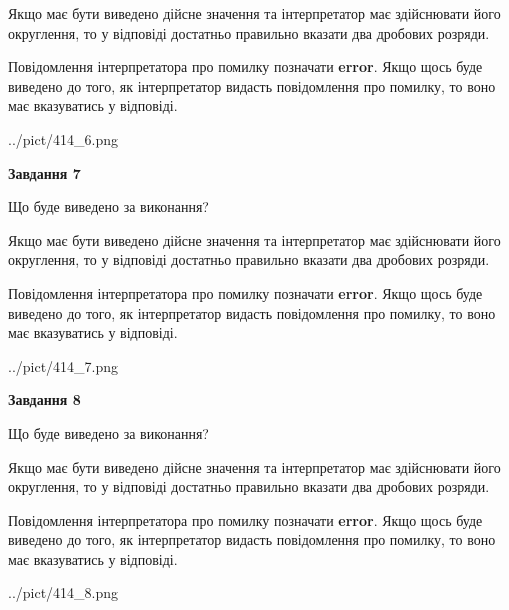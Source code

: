 \documentclass[12pt, ukrainian]{article}
\begin{document}
{\begin {Large}
Якщо має бути виведено дійсне значення та інтерпретатор має здійснювати його округлення, 
то у відповіді достатньо правильно вказати два дробових розряди.

Повідомлення інтерпретатора про помилку позначати \textbf{error}.
Якщо щось буде виведено до того, як інтерпретатор видасть повідомлення про помилку, 
то воно має вказуватись у відповіді. \par

\begin{center}
	{../pict/414_6.png}
\end{center}
\newpage

{\begin {center}\textbf{Завдання 7}\end {center}}\par
Що буде виведено за виконання? \par

Якщо має бути виведено дійсне значення та інтерпретатор має здійснювати його округлення, 
то у відповіді достатньо правильно вказати два дробових розряди.

Повідомлення інтерпретатора про помилку позначати \textbf{error}.
Якщо щось буде виведено до того, як інтерпретатор видасть повідомлення про помилку, 
то воно має вказуватись у відповіді. \par

\begin{center}
	{../pict/414_7.png}
\end{center}
\newpage

{\begin {center}\textbf{Завдання 8}\end {center}}\par
Що буде виведено за виконання? \par

Якщо має бути виведено дійсне значення та інтерпретатор має здійснювати його округлення, 
то у відповіді достатньо правильно вказати два дробових розряди.

Повідомлення інтерпретатора про помилку позначати \textbf{error}.
Якщо щось буде виведено до того, як інтерпретатор видасть повідомлення про помилку, 
то воно має вказуватись у відповіді. \par

\begin{center}
	{../pict/414_8.png}
\end{center}
\newpage


\end{Large}}
\end{document}
